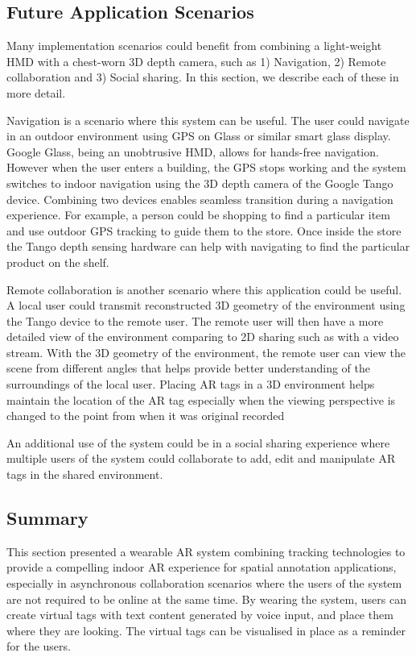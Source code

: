 \subsection{Future Application Scenarios}

Many implementation scenarios could benefit from combining a light-weight HMD with a chest-worn 3D depth camera, such as 1) Navigation, 2) Remote collaboration and 3) Social sharing. In this section, we describe each of these in more detail.

Navigation is a scenario where this system can be useful. The user could navigate in an outdoor environment using GPS on Glass or similar smart glass display. Google Glass, being an unobtrusive HMD, allows for hands-free navigation. However when the user enters a building, the GPS stops working and the system switches to indoor navigation using the 3D depth camera of the Google Tango device. Combining two devices enables seamless transition during a navigation experience. For example, a person could be shopping to find a particular item and use outdoor GPS tracking to guide them to the store. Once inside the store the Tango depth sensing hardware can help with navigating to find the particular product on the shelf.

Remote collaboration is another scenario where this application could be useful. A local user could transmit reconstructed 3D geometry of the environment using the Tango device to the remote user. The remote user will then have a more detailed view of the environment comparing to 2D sharing such as with a video stream. With the 3D geometry of the environment, the remote user can view the scene from different angles that helps provide better understanding of the surroundings of the local user. Placing AR tags in a 3D environment helps maintain the location of the AR tag especially when the viewing perspective is changed to the point from when it was original recorded

An additional use of the system could be in a social sharing experience where multiple users of the system could collaborate to add, edit and manipulate AR tags in the shared environment. 

\subsection{Summary}

This section presented a wearable AR system combining tracking technologies to provide a compelling indoor AR experience for spatial annotation applications, especially in asynchronous collaboration scenarios where the users of the system are not required to be online at the same time. By wearing the system, users can create virtual tags with text content generated by voice input, and place them where they are looking. The virtual tags can be visualised in place as a reminder for the users.  

